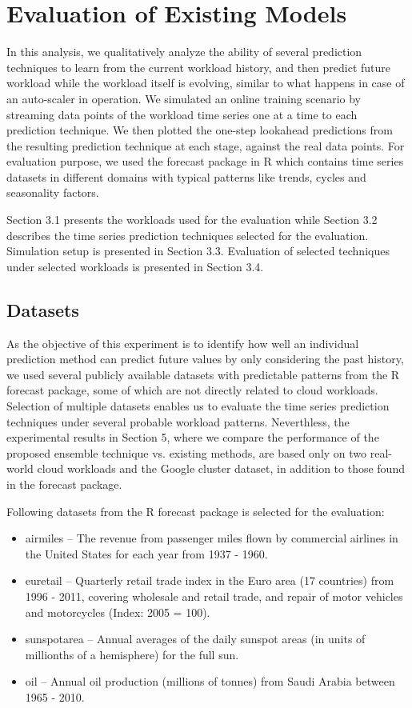 \section{Evaluation of Existing Models}

In this analysis, we qualitatively analyze the ability of several prediction techniques to learn from the current workload history, and then predict future workload while the workload itself is evolving, similar to what happens in case of an auto-scaler in operation. We simulated an online training scenario by streaming data points of the workload time series one at a time to each prediction technique. We then plotted the one-step lookahead predictions from the resulting prediction technique at each stage, against the real data points. For evaluation purpose, we used the forecast package in R \cite{forecastPackage} which contains time series datasets in different domains with typical patterns like trends, cycles and seasonality factors.

Section 3.1 presents the workloads used for the evaluation while Section 3.2 describes the time series prediction techniques selected for the evaluation. Simulation setup is presented in Section 3.3. Evaluation of selected techniques under selected workloads is presented in Section 3.4.

\subsection{Datasets}
As the objective of this experiment is to identify how well an individual prediction method can predict future values by only considering the past history, we used several publicly available datasets with predictable patterns from the R forecast package, some of which are not directly related to cloud workloads. Selection of multiple datasets enables us to evaluate the time series prediction techniques under several probable workload patterns. Neverthless, the experimental results in Section 5, where we compare the performance of the proposed ensemble technique vs. existing methods, are based only on two real-world cloud workloads and the Google cluster dataset, in addition to those found in the forecast package.

Following datasets from the R forecast package is selected for the evaluation:
\begin{itemize}
\item airmiles -- The revenue from passenger miles flown by commercial airlines in the United States for each year from 1937 - 1960.
\item euretail -- Quarterly retail trade index in the Euro area (17 countries) from 1996 - 2011, covering wholesale and retail trade, and repair of motor vehicles and motorcycles (Index: 2005 = 100).
\item sunspotarea -- Annual averages of the daily sunspot areas (in units of millionths of a hemisphere) for the full sun.
\item oil -- Annual oil production (millions of tonnes) from Saudi Arabia between 1965 - 2010.
\end{itemize}

